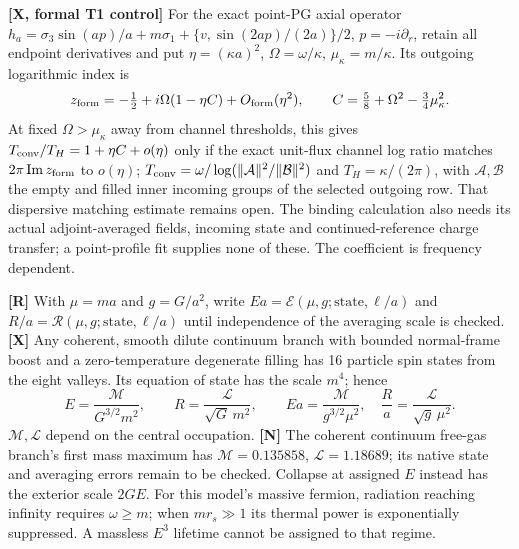 \textbf{[X, formal T1 control]} For the exact point-PG axial operator
$h_a=\sigma_3\sin(ap)/a+m\sigma_1+
\{v,\sin(2ap)/(2a)\}/2$, $p=-i\partial_r$, retain all endpoint derivatives and put
$\eta=(\kappa a)^2$, $\Omega=\omega/\kappa$, $\mu_\kappa=m/\kappa$.
Its outgoing logarithmic index is
\[
 z_{\rm form}=-\tfrac12+i\Omega(1-\eta C)+O_{\rm form}(\eta^2),
 \qquad C=\tfrac58+\Omega^2-\tfrac34\mu_\kappa^2.
\]
At fixed $\Omega>\mu_\kappa$ away from channel thresholds, this gives
$T_{\rm conv}/T_H=1+\eta C+o(\eta)$ only if the exact unit-flux channel
log ratio matches $2\pi\operatorname{Im}z_{\rm form}$ to $o(\eta)$;
$T_{\rm conv}=\omega/\log(\|\mathcal A\|^2/\|\mathcal B\|^2)$ and
$T_H=\kappa/(2\pi)$, with $\mathcal A,\mathcal B$ the empty and filled
inner incoming groups of the selected outgoing row.
That dispersive matching estimate remains open. The binding calculation
also needs its actual adjoint-averaged fields, incoming state and
continued-reference charge transfer; a point-profile fit supplies none
of these. The coefficient is frequency dependent.

\textbf{[R]} With $\mu=ma$ and $g=G/a^2$, write
$Ea=\mathcal E(\mu,g;\text{state},\ell/a)$ and
$R/a=\mathcal R(\mu,g;\text{state},\ell/a)$ until independence of the
averaging scale is checked.  \textbf{[X]} Any coherent, smooth dilute
continuum branch with bounded normal-frame boost and a zero-temperature
degenerate filling has 16 particle spin states from the eight valleys.
Its equation of state has the scale $m^4$; hence
\[
 E=\frac{\mathcal M}{G^{3/2}m^2},\qquad
 R=\frac{\mathcal L}{\sqrt G\,m^2},\qquad
 Ea=\frac{\mathcal M}{g^{3/2}\mu^2},\quad
 \frac Ra=\frac{\mathcal L}{\sqrt g\,\mu^2}.
\]
$\mathcal M,\mathcal L$ depend on the central occupation.
\textbf{[N]} The coherent continuum free-gas branch's first mass maximum
has $\mathcal M=0.135858$, $\mathcal L=1.18689$; its native state and
averaging errors remain to be checked.  Collapse at assigned $E$ instead
has the exterior scale $2GE$.
For this model's massive fermion, radiation reaching infinity requires
$\omega\geq m$; when $mr_s\gg1$ its thermal power is exponentially
suppressed.  A massless $E^3$ lifetime cannot be assigned to that regime.

